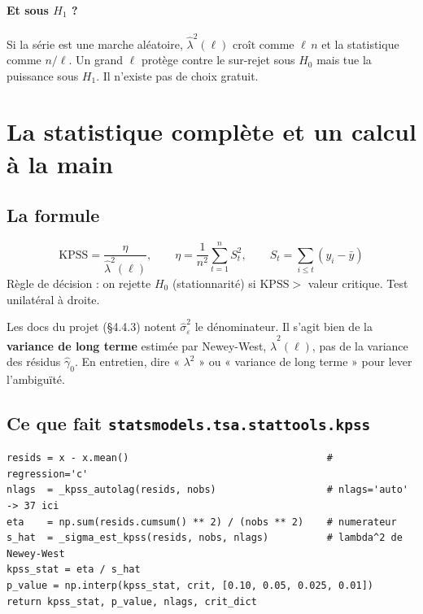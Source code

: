 \documentclass[11pt,a4paper]{article}
\newcommand{\KPSS}{\mathrm{KPSS}}
\newcommand{\code}[1]{\texttt{#1}}
\theoremstyle{definition}
\begin{document}
\paragraph{Et sous $H_1$ ?} Si la série est une marche aléatoire, $\hat\lambda^2(\ell)$ croît comme $\ell\,n$ et la statistique comme $n/\ell$. Un grand $\ell$ protège contre le sur-rejet sous $H_0$ mais tue la puissance sous $H_1$. Il n'existe pas de choix gratuit.

\section{La statistique complète et un calcul à la main}

\subsection{La formule}

\[
\boxed{\;\KPSS = \frac{\eta}{\hat\lambda^2(\ell)}, \qquad \eta = \frac{1}{n^2}\sum_{t=1}^{n}S_t^2, \qquad S_t = \sum_{i\le t}(y_i - \bar y)\;}
\]
Règle de décision : on rejette $H_0$ (stationnarité) si $\KPSS >$ valeur critique. Test unilatéral à droite.

\begin{piege}
Les docs du projet (\S4.4.3) notent $\hat\sigma_\varepsilon^2$ le dénominateur. Il s'agit bien de la \textbf{variance de long terme} estimée par Newey-West, $\hat\lambda^2(\ell)$, pas de la variance des résidus $\hat\gamma_0$. En entretien, dire « $\lambda^2$ » ou « variance de long terme » pour lever l'ambiguïté.
\end{piege}

\subsection{Ce que fait \texorpdfstring{\code{statsmodels.tsa.stattools.kpss}}{kpss}}

\begin{lstlisting}
resids = x - x.mean()                                  # regression='c'
nlags  = _kpss_autolag(resids, nobs)                   # nlags='auto' -> 37 ici
eta    = np.sum(resids.cumsum() ** 2) / (nobs ** 2)    # numerateur
s_hat  = _sigma_est_kpss(resids, nobs, nlags)          # lambda^2 de Newey-West
kpss_stat = eta / s_hat
p_value = np.interp(kpss_stat, crit, [0.10, 0.05, 0.025, 0.01])
return kpss_stat, p_value, nlags, crit_dict
\end{lstlisting}
\end{document}
